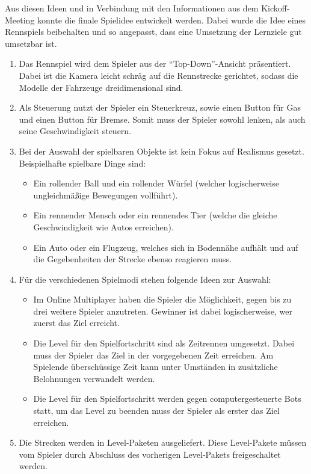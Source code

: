 	Aus diesen Ideen und in Verbindung mit den Informationen aus dem Kickoff-Meeting konnte die finale Spielidee entwickelt werden. Dabei wurde die Idee eines Rennspiels beibehalten und so angepasst, dass eine Umsetzung der Lernziele gut umsetzbar ist.
	\begin{enumerate}
		\item{Das Rennspiel wird dem Spieler aus der \enquote{Top-Down}-Ansicht präsentiert. Dabei ist die Kamera leicht schräg auf die Rennstrecke gerichtet, sodass die Modelle der Fahrzeuge dreidimensional sind.}
		\item{Als Steuerung nutzt der Spieler ein Steuerkreuz, sowie einen Button für Gas und einen Button für Bremse. Somit muss der Spieler sowohl lenken, als auch seine Geschwindigkeit steuern.}
		\item{Bei der Auswahl der spielbaren Objekte ist kein Fokus auf Realismus gesetzt. Beispielhafte spielbare Dinge sind:}
		\begin{itemize}
			\item{Ein rollender Ball und ein rollender Würfel (welcher logischerweise ungleichmäßige Bewegungen vollführt).}
			\item{Ein rennender Mensch oder ein rennendes Tier (welche die gleiche Geschwindigkeit wie Autos erreichen).}
			\item{Ein Auto oder ein Flugzeug, welches sich in Bodennähe aufhält und auf die Gegebenheiten der Strecke ebenso reagieren muss.}
		\end{itemize}
		\item{Für die verschiedenen Spielmodi stehen folgende Ideen zur Auswahl:}
		\begin{itemize}
			\item{Im Online Multiplayer haben die Spieler die Möglichkeit, gegen bis zu drei weitere Spieler anzutreten. Gewinner ist dabei logischerweise, wer zuerst das Ziel erreicht.}
			\item{Die Level für den Spielfortschritt sind als Zeitrennen umgesetzt. Dabei muss der Spieler das Ziel in der vorgegebenen Zeit erreichen. Am Spielende überschüssige Zeit kann unter Umständen in zusätzliche Belohnungen verwandelt werden.}
			\item{Die Level für den Spielfortschritt werden gegen computergesteuerte Bots statt, um das Level zu beenden muss der Spieler als erster das Ziel erreichen.}
		\end{itemize}
		\item{Die Strecken werden in Level-Paketen ausgeliefert. Diese Level-Pakete müssen vom Spieler durch Abschluss des vorherigen Level-Pakets freigeschaltet werden.}

\end{enumerate}
